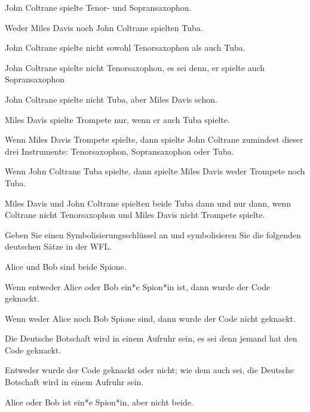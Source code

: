 \begin{earg}
\item John Coltrane spielte Tenor- und Sopransaxophon. %
\item Weder Miles Davis noch John Coltrane spielten Tuba. %
\item John Coltrane spielte nicht sowohl Tenorsaxophon als auch Tuba.  %
\item John Coltrane spielte nicht Tenorsaxophon, es sei denn, er spielte auch Sopransaxophon %
\item John Coltrane spielte nicht Tuba, aber Miles Davis schon. %
\item Miles Davis spielte Trompete nur, wenn er auch Tuba spielte. %
\item Wenn Miles Davis Trompete spielte, dann spielte John Coltrane zumindest dieser drei Instrumente: Tenorsaxophon, Sopransaxophon oder Tuba. %
\item Wenn John Coltrane Tuba spielte, dann spielte Miles Davis weder Trompete noch Tuba. %
\item Miles Davis und John Coltrane spielten beide Tuba dann und nur dann, wenn Coltrane nicht Tenorsaxophon und Miles Davis nicht Trompete spielte. %
\end{earg}

\solutions
\problempart
\label{pr.spies}
Geben Sie einen Symbolisierungsschlüssel an und symbolisieren Sie die folgenden deutschen Sätze in der WFL.
\begin{earg}
\item Alice und Bob sind beide Spione.
\item Wenn entweder Alice oder Bob ein*e Spion*in ist, dann wurde der Code geknackt.
\item Wenn weder Alice noch Bob Spione sind, dann wurde der Code nicht geknackt.
\item Die Deutsche Botschaft wird in einem Aufruhr sein, es sei denn jemand hat den Code geknackt.
\item Entweder wurde der Code geknackt oder nicht; wie dem auch sei, die Deutsche Botschaft wird in einem Aufruhr sein.
\item Alice oder Bob ist ein*e Spion*in, aber nicht beide.
\end{earg}

